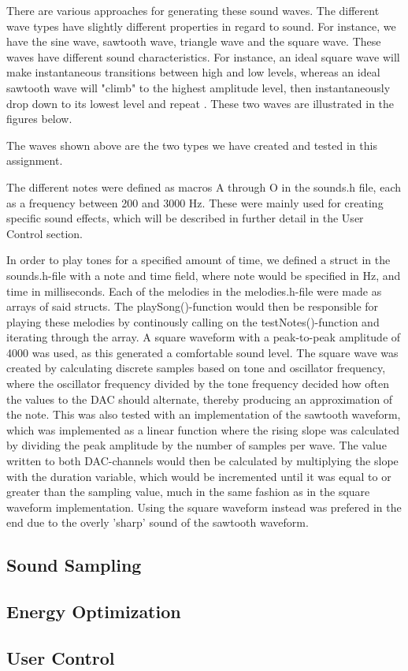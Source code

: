 There are various approaches for generating these sound waves. The different wave types have slightly different properties in regard to sound. For instance, we have the sine wave, sawtooth wave, triangle wave and the square wave. These waves have different sound characteristics. For instance, an ideal square wave will make instantaneous transitions between high and low levels, whereas an ideal sawtooth wave will "climb" to the highest amplitude level, then instantaneously drop down to its lowest level and repeat \cite{audioWaves}. These two waves are illustrated in the figures below.




The waves shown above are the two types we have created and tested in this assignment. 

The different notes were defined as macros A through O in the sounds.h file, each as a frequency between 200 and 3000 Hz. These were mainly used for creating specific sound effects, which will be described in further detail in the User Control section.
	
In order to play tones for a specified amount of time, we defined a struct in the sounds.h-file with a note and time field, where note would be specified in Hz, and time in milliseconds. Each of the melodies in the melodies.h-file were made as arrays of said structs. The playSong()-function would then be responsible for playing these melodies by continously calling on the testNotes()-function and iterating through the array. A square waveform with a peak-to-peak amplitude of 4000 was used, as this generated a comfortable sound level. The square wave was created by calculating discrete samples based on tone and oscillator frequency, where the oscillator frequency divided by the tone frequency decided how often the values to the DAC should alternate, thereby producing an approximation of the note. This was also tested with an implementation of the sawtooth waveform, which was implemented as a linear function where the rising slope was calculated by dividing the peak amplitude by the number of samples per wave. The value written to both DAC-channels would then be calculated by multiplying the slope with the duration variable, which would be incremented until it was equal to or greater than the sampling value, much in the same fashion as in the square waveform implementation.
	Using the square waveform instead was prefered in the end due to the overly 'sharp' sound of the sawtooth waveform.

\subsection{Sound Sampling}



\subsection{Energy Optimization}




\subsection{User Control}
